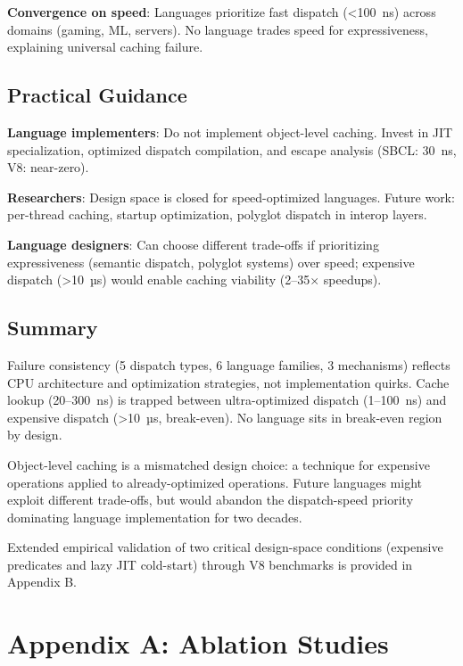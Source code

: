 \documentclass[sigplan,final,acmsmall,review,screen]{acmart}
\begin{document}
\textbf{Convergence on speed}: Languages prioritize fast dispatch (<100~ns) across domains (gaming, ML, servers). No language trades speed for expressiveness, explaining universal caching failure.

\subsection{Practical Guidance}

\textbf{Language implementers}: Do not implement object-level caching. Invest in JIT specialization, optimized dispatch compilation, and escape analysis (SBCL: 30~ns, V8: near-zero).

\textbf{Researchers}: Design space is closed for speed-optimized languages. Future work: per-thread caching, startup optimization, polyglot dispatch in interop layers.

\textbf{Language designers}: Can choose different trade-offs if prioritizing expressiveness (semantic dispatch, polyglot systems) over speed; expensive dispatch (>10~µs) would enable caching viability (2--35× speedups).

\subsection{Summary}

Failure consistency (5 dispatch types, 6 language families, 3 mechanisms) reflects CPU architecture and optimization strategies, not implementation quirks. Cache lookup (20--300~ns) is trapped between ultra-optimized dispatch (1--100~ns) and expensive dispatch (>10~µs, break-even). No language sits in break-even region by design.

Object-level caching is a mismatched design choice: a technique for expensive operations applied to already-optimized operations. Future languages might exploit different trade-offs, but would abandon the dispatch-speed priority dominating language implementation for two decades.

Extended empirical validation of two critical design-space conditions (expensive predicates and lazy JIT cold-start) through V8 benchmarks is provided in Appendix B.

\appendix

\section*{Appendix A: Ablation Studies}
\label{app:ablations}
\end{document}
